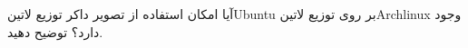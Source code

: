 
آیا امکان استفاده از تصویر داکر توزیع ‌لاتین{Ubuntu} بر روی توزیع ‌لاتین{Archlinux} وجود دارد؟ توضیح دهید.

